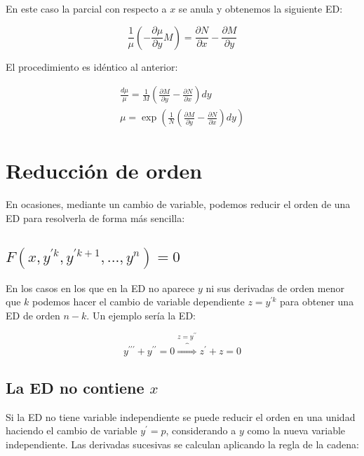 \documentclass[a4paper,12pt,titlepage]{article}
\begin{document}
En este caso la parcial con respecto a $x$ se anula y obtenemos la siguiente ED:

\begin{equation*}
    \frac{1}{\mu} \left (-\frac{\partial \mu}{\partial y}M \right ) =\frac{\partial N}{\partial x} - \frac{\partial M}{\partial y}
\end{equation*}

El procedimiento es idéntico al anterior:

\begin{equation*}
    \begin{gathered}
        \frac{d\mu}{\mu} = \frac{1}{M} \left (\frac{\partial M}{\partial y} - \frac{\partial N}{\partial x} \right ) dy \\
        \mu = \exp \left (\frac{1}{N} \left (\frac{\partial M}{\partial y} - \frac{\partial N}{\partial x} \right ) dy \right )
    \end{gathered}
\end{equation*}

\section{Reducción de orden}

En ocasiones, mediante un cambio de variable, podemos reducir el orden de una ED para resolverla de forma más sencilla:

\subsection{$F(x,y^{\prime k},y^{\prime k+1},...,y^n)=0$}

En los casos en los que en la ED no aparece $y$ ni sus derivadas de orden menor que $k$ podemos hacer el cambio de variable dependiente $z=y^{\prime k}$ para obtener una ED de orden $n-k$. Un ejemplo sería la ED:

\begin{equation*}
    y^{\prime \prime \prime} + y^{\prime \prime }=0 \overbrace{\Rightarrow}^{z=y^{\prime \prime}} z^\prime +z =0
\end{equation*}

\subsection{La ED no contiene $x$}

Si la ED no tiene variable independiente se puede reducir el orden en una unidad haciendo el cambio de variable $y^{\prime}=p$, considerando a $y$ como la nueva variable independiente. Las derivadas sucesivas se calculan aplicando la regla de la cadena:
\end{document}
